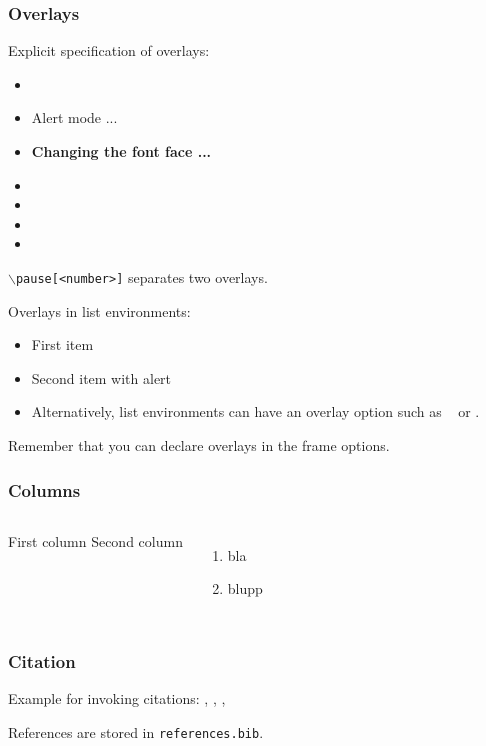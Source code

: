 \begin{frame}
  \frametitle{Overlays}
  {\small 

    Explicit specification of overlays:
    \begin{itemize}
    \item {}
    \item \alert<3>{Alert mode ...} 
    \item \textbf<4>{Changing the font face ...}
    \item {} 
    \item {}
    \item {}
    \item {}
    \end{itemize}

    \vfill
    {\tt $\backslash$pause[<number>]} separates two overlays.

    \vfill
    Overlays in list environments:
    \begin{itemize}
    \item<9-> First item
    \item<alert@10> Second item with alert
    \item Alternatively, list environments can have an overlay option such as {\tt <+-> } or {\tt <+- alert@ +>}.
    \end{itemize}

    \vfill
    Remember that you can declare overlays in the frame options.
    \hyperlink{frameoptions}{}

  }
\end{frame}
\begin{frame}
  \frametitle{Columns}

  \begin{columns}
    First column
		Second column
    \begin{enumerate}
    \item bla
    \item blupp
    \end{enumerate}
  \end{columns}

\end{frame}

\begin{frame}
\frametitle{Citation}
Example for invoking citations: \cite{Bech:63}, \citet[291]{Bech:63}, \citep{Bech:63}, \citealt{Bech:63}

References are stored in \texttt{references.bib}.
\end{frame}

